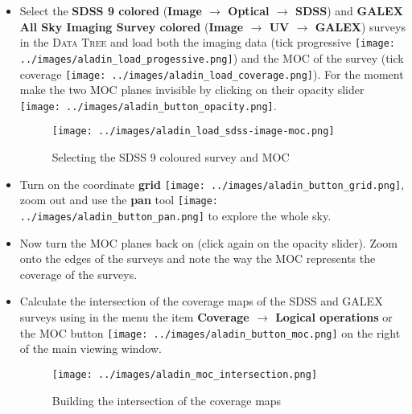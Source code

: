 \documentclass [a4paper, 12pt]{article}
\begin{document}
\begin{itemize}
    \item Select the \textbf{SDSS 9 colored} (\textbf{Image $\rightarrow$
Optical $\rightarrow$ SDSS}) and \textbf{GALEX All Sky Imaging Survey
colored} (\textbf{Image $\rightarrow$ UV $\rightarrow$ GALEX}) surveys in the
\textsc{Data Tree} and load both the imaging data (tick progressive
\texttt{[image: ../images/aladin\_load\_progessive.png]})
and the MOC of the survey (tick coverage
\texttt{[image: ../images/aladin\_load\_coverage.png]}). For
the moment make the two MOC planes invisible by clicking on their opacity slider
\texttt{[image: ../images/aladin\_button\_opacity.png]}.
\begin{figure}[H]
\center
\texttt{[image: ../images/aladin\_load\_sdss-image-moc.png]}
\caption{Selecting the SDSS 9 coloured survey and MOC}
\label{fig:aladinselect}
\end{figure}

    \item Turn on the coordinate \textbf{grid}
\texttt{[image: ../images/aladin\_button\_grid.png]}, zoom
out and use
the \textbf{pan} tool
\texttt{[image: ../images/aladin\_button\_pan.png]} to
explore the whole sky.

    \item Now turn the MOC planes back on (click again on the opacity slider).
Zoom onto the edges of the surveys and note the way the MOC represents the
coverage of the surveys.

    \item Calculate the intersection of the coverage maps of the SDSS and
GALEX surveys using in the menu the item \textbf{Coverage $\rightarrow$
Logical operations} or the MOC button
\texttt{[image: ../images/aladin\_button\_moc.png]} on the
right of the main viewing window.

\begin{figure}[H]
\center
\texttt{[image: ../images/aladin\_moc\_intersection.png]}
\caption{Building the intersection of the coverage maps}
\label{fig:intersec}
\end{figure}


\end{itemize}
\end{document}
